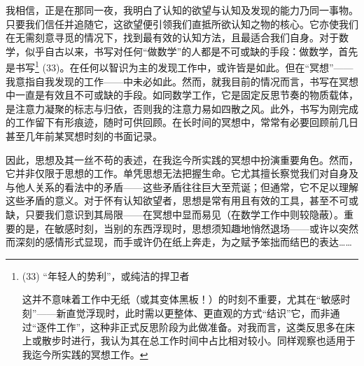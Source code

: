 我相信，正是在那同一夜，我明白了认知的欲望与认知及发现的能力乃同一事物。只要我们信任并追随它，这欲望便引领我们直抵所欲认知之物的核心。它亦使我们在无需刻意寻觅的情况下，找到最有效的认知方法，且最适合我们自身。对于数学，似乎自古以来，书写对任何“做数学”的人都是不可或缺的手段：做数学，首先是书写\footnote{(33) “年轻人的势利”，或纯洁的捍卫者

这并不意味着工作中无纸（或其变体黑板！）的时刻不重要，尤其在“敏感时刻”——新直觉浮现时，此时需以更整体、更直观的方式“结识”它，而非通过“逐件工作”，这种非正式反思阶段为此做准备。对我而言，这类反思多在床上或散步时进行，我认为其在总工作时间中占比相对较小。同样观察也适用于我迄今所实践的冥想工作。} (33)。在任何以智识为主的发现工作中，或许皆是如此。但在“冥想”——我意指自我发现的工作——中未必如此。然而，就我目前的情况而言，书写在冥想中一直是有效且不可或缺的手段。如同数学工作，它是固定反思节奏的物质载体，是注意力凝聚的标志与归依，否则我的注意力易如四散之风。此外，书写为刚完成的工作留下有形痕迹，随时可供回顾。在长时间的冥想中，常常有必要回顾前几日甚至几年前某冥想时刻的书面记录。

因此，思想及其一丝不苟的表述，在我迄今所实践的冥想中扮演重要角色。然而，它并非仅限于思想的工作。单凭思想无法把握生命。它尤其擅长察觉我们对自身及与他人关系的看法中的矛盾——这些矛盾往往巨大至荒诞；但通常，它不足以理解这些矛盾的意义。对于怀有认知欲望者，思想是常有用且有效的工具，甚至不可或缺，只要我们意识到其局限——在冥想中显而易见（在数学工作中则较隐蔽）。重要的是，在敏感时刻，当别的东西浮现时，思想须知趣地悄然退场——或许以突然而深刻的感情形式显现，而手或许仍在纸上奔走，为之赋予笨拙而结巴的表达……